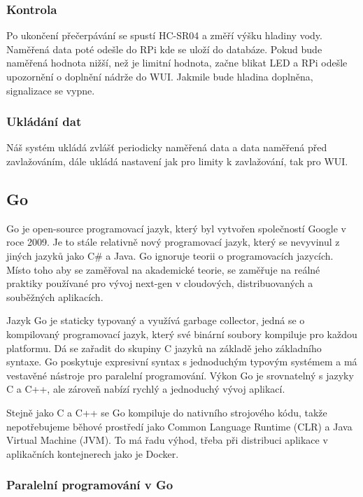 \documentclass[12pt,a4paper]{article}
\begin{document}
\subsubsection{Kontrola}

Po ukončení přečerpávání se spustí \ac{HC-SR04} a změří výšku hladiny vody. Naměřená data poté odešle do \ac{RPi} kde se uloží do databáze. Pokud bude naměřená hodnota nižší, než je limitní hodnota, začne blikat \ac{LED} a \ac{RPi} odešle upozornění o doplnění nádrže do \ac{WUI}. Jakmile bude hladina doplněna, signalizace se vypne.

\subsubsection{Ukládání dat}

Náš systém ukládá zvlášť periodicky naměřená data a data naměřená před zavlažováním, dále ukládá nastavení jak pro limity k zavlažování, tak pro \ac{WUI}.

\subsection{Go}

Go je open-source programovací jazyk, který byl vytvořen společností Google v roce 2009. Je to stále relativně nový programovací jazyk, který se nevyvinul z jiných jazyků jako C\# a Java. Go ignoruje teorii o programovacích jazycích. Místo toho aby se zaměřoval na akademické teorie, se zaměřuje na reálné praktiky používané pro vývoj next-gen v cloudových, distribuovaných a souběžných aplikacích.

Jazyk Go je staticky typovaný a využívá garbage collector, jedná se o kompilovaný programovací jazyk, který své binární soubory kompiluje pro každou platformu. Dá se zařadit do skupiny C jazyků na základě jeho základního syntaxe. Go poskytuje expresivní syntax s jednoduchým typovým systémem a má vestavěné nástroje pro paralelní programování. Výkon Go je srovnatelný s jazyky C a C++, ale zároveň nabízí rychlý a jednoduchý vývoj aplikací.

Stejně jako C a C++ se Go kompiluje do nativního strojového kódu, takže
nepotřebujeme běhové prostředí jako Common Language Runtime (CLR) a Java Virtual Machine (JVM). To má řadu výhod, třeba při distribuci aplikace v aplikačních kontejnerech jako je Docker.

\subsubsection{Paralelní programování v Go}
\end{document}
